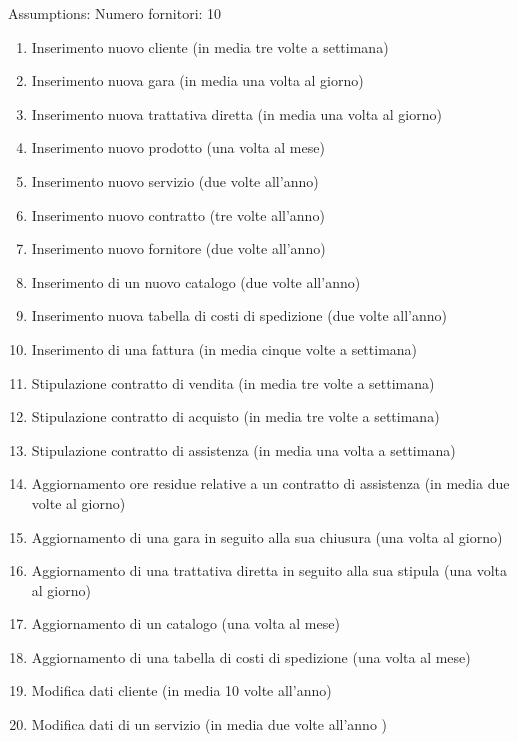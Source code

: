 

Assumptions: Numero fornitori: 10

\begin{enumerate}

  \item Inserimento nuovo cliente (in media tre volte a settimana)
  \item Inserimento nuova gara (in media una volta al giorno)
  \item Inserimento nuova trattativa diretta (in media una volta al giorno)
  \item Inserimento nuovo prodotto (una volta al mese)
  \item Inserimento nuovo servizio (due volte all'anno)
  \item Inserimento nuovo contratto (tre volte all'anno)
  \item Inserimento nuovo fornitore (due volte all'anno)
  \item Inserimento di un nuovo catalogo (due volte all'anno)
  \item Inserimento nuova tabella di costi di spedizione (due volte all'anno)
  \item Inserimento di una fattura (in media cinque volte a settimana)
  \item Stipulazione contratto di vendita (in media tre volte a settimana)
  \item Stipulazione contratto di acquisto (in media tre volte a settimana)
  \item Stipulazione contratto di assistenza (in media una volta a settimana)
  \item Aggiornamento ore residue relative a un contratto di assistenza (in media due volte al giorno)
  \item Aggiornamento di una gara in seguito alla sua chiusura (una volta al giorno)
  \item Aggiornamento di una trattativa diretta in seguito alla sua stipula (una volta al giorno)
  \item Aggiornamento di un catalogo (una volta al mese)
  \item Aggiornamento di una tabella di costi di spedizione (una volta al mese)
  \item Modifica dati cliente (in media 10 volte all'anno)
  \item Modifica dati di un servizio (in media due volte all'anno )

\end{enumerate}
